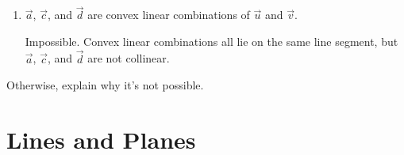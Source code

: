 \begin{parts}
\begin{enumerate}
				\item $\vec a$, $\vec c$, and $\vec d$ are convex linear
					combinations of $\vec u$ and $\vec v$.
				\begin{solution}
					Impossible. Convex linear combinations all lie on the same line segment,
					but $\vec a$, $\vec c$, and $\vec d$ are not collinear.
				\end{solution}
			\end{enumerate}Otherwise, explain why it's not possible.
	\end{parts}

	\displayonlynewpage
	\bookonlynewpage
\section*{Lines and Planes}

